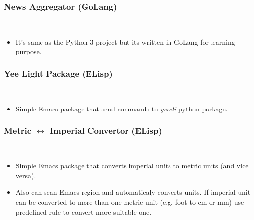 \documentclass[a4paper, 9pt]{extarticle}
\begin{document}
\subsubsection{News Aggregator (GoLang)} \hfill \\
\vspace{-1.9em}\begin{itemize}
    \itemsep-0.7em
    \item It's same as the Python 3 project but its written in GoLang for learning purpose.
\end{itemize}

\subsubsection{Yee Light Package (ELisp)} \hfill \\
\vspace{-1.9em}\begin{itemize}
    \itemsep-0.7em
    \item Simple Emacs package that send commands to \emph{yeecli} python package.
\end{itemize}

\subsubsection{Metric $\longleftrightarrow$ Imperial Convertor (ELisp)} \hfill \\
\vspace{-1.9em}\begin{itemize}
    \itemsep-0.7em
    \item Simple Emacs package that converts imperial units to metric units (and vice versa).
    \item Also can scan Emacs region and automaticaly converts units. If imperial unit can be converted to more than one metric unit (e.g. foot to cm or mm) use predefined rule to convert more suitable one.
\end{itemize}

\mylanguages{}
\mytechnicalskillsb{}
\myhobbiesb{}

\end{document}

